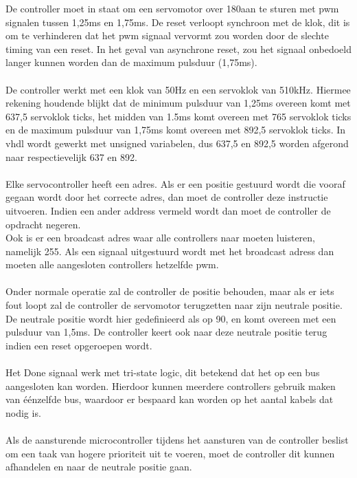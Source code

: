 De controller moet in staat om een servomotor over 180\textdegree  aan te sturen met \gls{pwm} signalen tussen 1,25ms en 1,75ms. De reset verloopt synchroon met de klok, dit is om te verhinderen dat het \gls{pwm} signaal vervormt zou worden door de slechte timing van een reset. In het geval van asynchrone reset, zou het  signaal onbedoeld langer kunnen worden dan de maximum pulsduur (1,75ms).\\
\\
De controller werkt met een klok van 50Hz en een servoklok van 510kHz. Hiermee rekening houdende blijkt dat de minimum pulsduur van 1,25ms overeen komt met 637,5 servoklok ticks, het midden van 1.5ms komt overeen met 765 servoklok ticks en de maximum pulsduur van 1,75ms komt overeen met 892,5 servoklok ticks. In \gls{vhdl} wordt gewerkt met unsigned variabelen, dus 637,5 en 892,5 worden afgerond naar respectievelijk 637 en 892.\\
\\
Elke servocontroller heeft een adres. Als er een positie gestuurd wordt die vooraf gegaan wordt door het correcte adres, dan moet de controller deze instructie uitvoeren. Indien een ander address vermeld wordt dan moet de controller de opdracht negeren.\\
Ook is er een broadcast adres waar alle controllers  naar moeten luisteren, namelijk 255. Als een signaal uitgestuurd wordt met het broadcast adress dan moeten alle aangesloten controllers hetzelfde \gls{pwm}.\\
\\
Onder normale operatie zal de controller de positie behouden, maar als er iets fout loopt zal de controller de servomotor terugzetten naar zijn neutrale positie. De neutrale positie wordt hier gedefinieerd als op 90\textdegree, en komt overeen met een pulsduur van 1,5ms. De controller keert ook naar deze neutrale positie terug indien een reset opgeroepen wordt.\\
\\
Het Done signaal werk met tri-state logic, dit betekend dat het op een bus aangesloten kan worden. Hierdoor kunnen meerdere controllers gebruik maken van éénzelfde bus, waardoor er bespaard kan worden op het aantal kabels dat nodig is.\\
\\
Als de aansturende microcontroller tijdens het aansturen van de controller beslist om een taak van hogere prioriteit uit te voeren, moet de controller dit kunnen afhandelen en naar de neutrale positie gaan.\\
